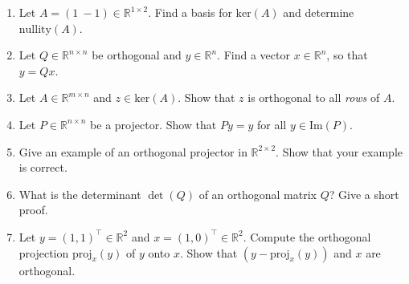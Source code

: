 \vspace*{-0.5cm}
\begin{enumerate}
	\item Let $A = (1 ~-1) \in \mathbb{R}^{1 \times 2}$. Find a basis for $\text{ker}(A) $ and determine $\text{nullity}(A)$.
	\item Let $Q \in \mathbb{R}^{n \times n}$ be orthogonal and $y \in\mathbb{R}^{n}$. Find a vector $x \in\mathbb{R}^{n}$, so that $y = Qx$.
	\item Let $A \in \mathbb{R}^{m \times n}$ and  $z \in \text{ker}(A)$. Show that $z$ is orthogonal to all \textit{rows} of $A$.
	\item Let $P\in\mathbb{R}^{n\times n}$ be a projector. Show that $Py = y$ for all $y \in \text{Im}(P)$.
	\item Give an example of an orthogonal projector in $\mathbb{R}^{2\times 2}$. Show that your example is correct.
	\item What is the determinant $\det(Q)$ of an orthogonal matrix $Q$? Give a short proof.
	\item Let  $y=(1,1)^\top \in \mathbb{R}^{2}$ and $x=(1,0)^\top\in \mathbb{R}^{2}$. Compute the orthogonal projection $\text{proj}_x(y) $ of $y$ onto $x$. Show that $(y - \text{proj}_x(y))$ and $x$ are orthogonal.
\end{enumerate}
 